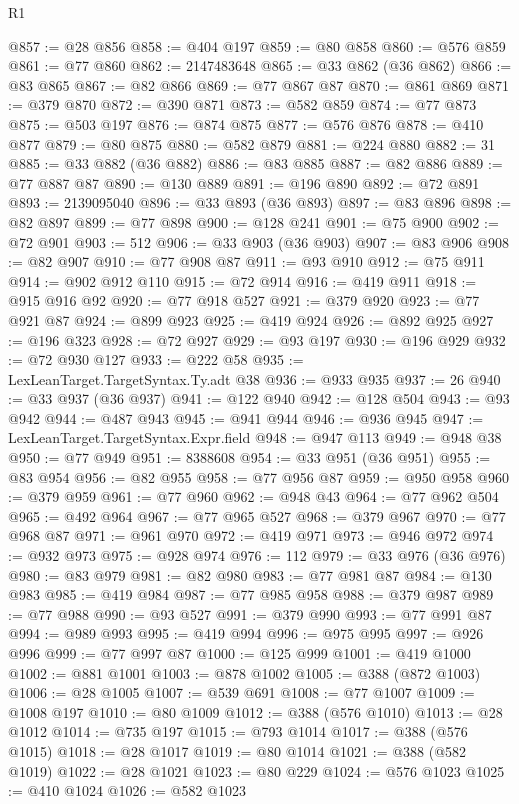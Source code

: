 \begin{lexlean}{R1}
\begin{coremodule}
@857 := @28 @856
@858 := @404 @197
@859 := @80 @858
@860 := @576 @859
@861 := @77 @860
@862 := 2147483648
@865 := @33 @862 (@36 @862)
@866 := @83 @865
@867 := @82 @866
@869 := @77 @867 @87
@870 := @861 @869
@871 := @379 @870
@872 := @390 @871
@873 := @582 @859
@874 := @77 @873
@875 := @503 @197
@876 := @874 @875
@877 := @576 @876
@878 := @410 @877
@879 := @80 @875
@880 := @582 @879
@881 := @224 @880
@882 := 31
@885 := @33 @882 (@36 @882)
@886 := @83 @885
@887 := @82 @886
@889 := @77 @887 @87
@890 := @130 @889
@891 := @196 @890
@892 := @72 @891
@893 := 2139095040
@896 := @33 @893 (@36 @893)
@897 := @83 @896
@898 := @82 @897
@899 := @77 @898
@900 := @128 @241
@901 := @75 @900
@902 := @72 @901
@903 := 512
@906 := @33 @903 (@36 @903)
@907 := @83 @906
@908 := @82 @907
@910 := @77 @908 @87
@911 := @93 @910
@912 := @75 @911
@914 := @902 @912 @110
@915 := @72 @914
@916 := @419 @911
@918 := @915 @916 @92
@920 := @77 @918 @527
@921 := @379 @920
@923 := @77 @921 @87
@924 := @899 @923
@925 := @419 @924
@926 := @892 @925
@927 := @196 @323
@928 := @72 @927
@929 := @93 @197
@930 := @196 @929
@932 := @72 @930 @127
@933 := @222 @58
@935 := LexLeanTarget.TargetSyntax.Ty.adt @38
@936 := @933 @935
@937 := 26
@940 := @33 @937 (@36 @937)
@941 := @122 @940
@942 := @128 @504
@943 := @93 @942
@944 := @487 @943
@945 := @941 @944
@946 := @936 @945
@947 := LexLeanTarget.TargetSyntax.Expr.field
@948 := @947 @113
@949 := @948 @38
@950 := @77 @949
@951 := 8388608
@954 := @33 @951 (@36 @951)
@955 := @83 @954
@956 := @82 @955
@958 := @77 @956 @87
@959 := @950 @958
@960 := @379 @959
@961 := @77 @960
@962 := @948 @43
@964 := @77 @962 @504
@965 := @492 @964
@967 := @77 @965 @527
@968 := @379 @967
@970 := @77 @968 @87
@971 := @961 @970
@972 := @419 @971
@973 := @946 @972
@974 := @932 @973
@975 := @928 @974
@976 := 112
@979 := @33 @976 (@36 @976)
@980 := @83 @979
@981 := @82 @980
@983 := @77 @981 @87
@984 := @130 @983
@985 := @419 @984
@987 := @77 @985 @958
@988 := @379 @987
@989 := @77 @988
@990 := @93 @527
@991 := @379 @990
@993 := @77 @991 @87
@994 := @989 @993
@995 := @419 @994
@996 := @975 @995
@997 := @926 @996
@999 := @77 @997 @87
@1000 := @125 @999
@1001 := @419 @1000
@1002 := @881 @1001
@1003 := @878 @1002
@1005 := @388 (@872 @1003)
@1006 := @28 @1005
@1007 := @539 @691
@1008 := @77 @1007
@1009 := @1008 @197
@1010 := @80 @1009
@1012 := @388 (@576 @1010)
@1013 := @28 @1012
@1014 := @735 @197
@1015 := @793 @1014
@1017 := @388 (@576 @1015)
@1018 := @28 @1017
@1019 := @80 @1014
@1021 := @388 (@582 @1019)
@1022 := @28 @1021
@1023 := @80 @229
@1024 := @576 @1023
@1025 := @410 @1024
@1026 := @582 @1023

\end{coremodule}
\end{lexlean}
